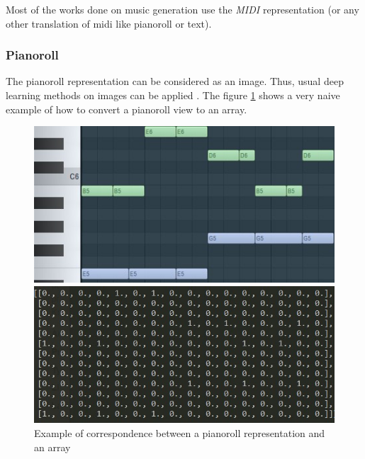 \documentclass[12pt]{report}
\begin{document}
Most of the works done on music generation use the \textit{MIDI} representation (or any other translation of midi like pianoroll or text). \cite{chuan_modeling_nodate, hadjeres_deepbach:_2016, huang_counterpoint_2017, liang_automatic_2017, adiloglu_machine_2007, herremans_composing_2013, herremans_modeling_2017, boulanger-lewandowski_modeling_2012, lattner_imposing_2018, colombo_learning_2019, brunner_symbolic_2018, wu_hierarchical_2018}

\subsubsection{Pianoroll}

The pianoroll representation can be considered as an image.
Thus, usual deep learning methods on images can  be applied \cite{huang_counterpoint_2017, chuan_modeling_nodate, boulanger-lewandowski_modeling_2012, lattner_imposing_2018, donahue_adversarial_2019}.
The figure \ref{fig:pianoroll_to_array} shows a very naive example of how to convert a pianoroll view to an array.

\begin{figure}[H]
   \begin{minipage}{0.5\textwidth}
     \centering
     \includegraphics[width=.9\linewidth]{images/music/pianoroll/pianoroll_small.jpg}
   \end{minipage}\hfill
   \begin{minipage}{0.5\textwidth}
     \centering
     \includegraphics[width=\linewidth]{images/music/pianoroll/pianoroll_small_array.jpg}
   \end{minipage}
 \caption{Example of correspondence between a pianoroll representation and an array}
 \label{fig:pianoroll_to_array}
\end{figure}
\end{document}
